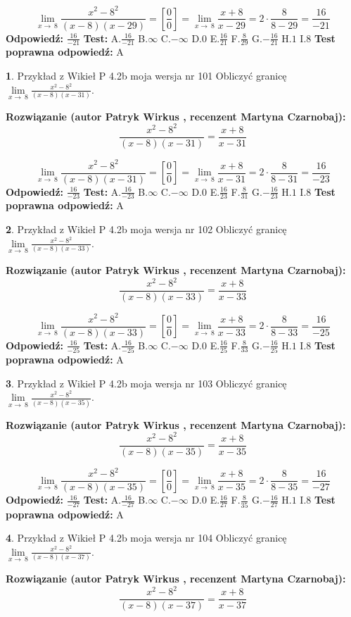 \documentclass[12pt, a4paper]{article}
\theoremstyle{definition} %
\newtheorem{zad}{}
\newcommand{\zadStart}[1]{\begin{zad}#1\newline}
\newcommand{\zadStop}{\end{zad}}
\newcommand{\rozwStart}[2]{\noindent \textbf{Rozwiązanie (autor #1 , recenzent #2): }\newline}
\newcommand{\rozwStop}{\newline}
\newcommand{\odpStart}{\noindent \textbf{Odpowiedź:}\newline}
\newcommand{\odpStop}{\newline}
\newcommand{\testStart}{\noindent \textbf{Test:}\newline}
\newcommand{\testStop}{\newline}
\newcommand{\kluczStart}{\noindent \textbf{Test poprawna odpowiedź:}\newline}
\newcommand{\kluczStop}{\newline}
\begin{document}
$$\lim\limits_{x\to\ 8}\frac{x^{2}-8^{2}}{(x-8)(x-29)}=[\frac{0}{0}]=\lim\limits_{x\to\ 8}\frac{x+8}{x-29}=2 \cdot \frac{8}{8-29} = \frac{16}{-21}$$
\rozwStop
\odpStart
$\frac{16}{-21}$
\odpStop
\testStart
A.$\frac{16}{-21}$
B.$\infty$
C.$-\infty$
D.$0$
E.$\frac{16}{21}$
F.$\frac{8}{29}$
G.$-\frac{16}{21}$
H.$1$
I.$8$
\testStop
\kluczStart
A
\kluczStop



\zadStart{Przykład z Wikieł P 4.2b moja wersja nr 101}
Obliczyć granicę $\lim\limits_{x\to\ 8}\frac{x^{2}-8^{2}}{(x-8)(x-31)}$.
\zadStop
\rozwStart{Patryk Wirkus}{Martyna Czarnobaj}
$$\frac{x^{2}-8^{2}}{(x-8)(x-31)}=\frac{x+8}{x-31}$$

$$\lim\limits_{x\to\ 8}\frac{x^{2}-8^{2}}{(x-8)(x-31)}=[\frac{0}{0}]=\lim\limits_{x\to\ 8}\frac{x+8}{x-31}=2 \cdot \frac{8}{8-31} = \frac{16}{-23}$$
\rozwStop
\odpStart
$\frac{16}{-23}$
\odpStop
\testStart
A.$\frac{16}{-23}$
B.$\infty$
C.$-\infty$
D.$0$
E.$\frac{16}{23}$
F.$\frac{8}{31}$
G.$-\frac{16}{23}$
H.$1$
I.$8$
\testStop
\kluczStart
A
\kluczStop



\zadStart{Przykład z Wikieł P 4.2b moja wersja nr 102}
Obliczyć granicę $\lim\limits_{x\to\ 8}\frac{x^{2}-8^{2}}{(x-8)(x-33)}$.
\zadStop
\rozwStart{Patryk Wirkus}{Martyna Czarnobaj}
$$\frac{x^{2}-8^{2}}{(x-8)(x-33)}=\frac{x+8}{x-33}$$

$$\lim\limits_{x\to\ 8}\frac{x^{2}-8^{2}}{(x-8)(x-33)}=[\frac{0}{0}]=\lim\limits_{x\to\ 8}\frac{x+8}{x-33}=2 \cdot \frac{8}{8-33} = \frac{16}{-25}$$
\rozwStop
\odpStart
$\frac{16}{-25}$
\odpStop
\testStart
A.$\frac{16}{-25}$
B.$\infty$
C.$-\infty$
D.$0$
E.$\frac{16}{25}$
F.$\frac{8}{33}$
G.$-\frac{16}{25}$
H.$1$
I.$8$
\testStop
\kluczStart
A
\kluczStop



\zadStart{Przykład z Wikieł P 4.2b moja wersja nr 103}
Obliczyć granicę $\lim\limits_{x\to\ 8}\frac{x^{2}-8^{2}}{(x-8)(x-35)}$.
\zadStop
\rozwStart{Patryk Wirkus}{Martyna Czarnobaj}
$$\frac{x^{2}-8^{2}}{(x-8)(x-35)}=\frac{x+8}{x-35}$$

$$\lim\limits_{x\to\ 8}\frac{x^{2}-8^{2}}{(x-8)(x-35)}=[\frac{0}{0}]=\lim\limits_{x\to\ 8}\frac{x+8}{x-35}=2 \cdot \frac{8}{8-35} = \frac{16}{-27}$$
\rozwStop
\odpStart
$\frac{16}{-27}$
\odpStop
\testStart
A.$\frac{16}{-27}$
B.$\infty$
C.$-\infty$
D.$0$
E.$\frac{16}{27}$
F.$\frac{8}{35}$
G.$-\frac{16}{27}$
H.$1$
I.$8$
\testStop
\kluczStart
A
\kluczStop



\zadStart{Przykład z Wikieł P 4.2b moja wersja nr 104}
Obliczyć granicę $\lim\limits_{x\to\ 8}\frac{x^{2}-8^{2}}{(x-8)(x-37)}$.
\zadStop
\rozwStart{Patryk Wirkus}{Martyna Czarnobaj}
$$\frac{x^{2}-8^{2}}{(x-8)(x-37)}=\frac{x+8}{x-37}$$
\end{document}
